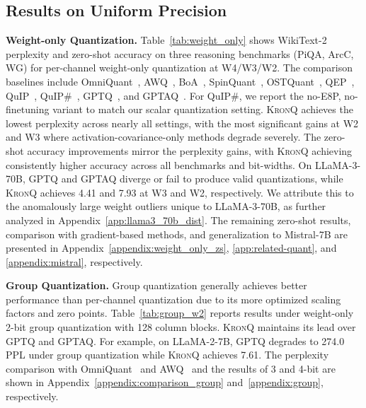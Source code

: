 \documentclass{article} %
\newcommand{\KronQ}{\textsc{KronQ}}
\begin{document}
\subsection{Results on Uniform Precision}
\label{sec:exp:wonly}
\vspace{-2mm}
\noindent \textbf{Weight-only Quantization.} Table~\ref{tab:weight_only} shows WikiText-2 perplexity and zero-shot accuracy on three reasoning benchmarks (PiQA, ArcC, WG) for per-channel weight-only quantization at W4/W3/W2. The comparison baselines include OmniQuant~\citep{shao2023omniquant}, AWQ~\citep{lin2024awq}, BoA~\citep{kim2024boa}, SpinQuant~\citep{liu2024spinquant}, OSTQuant~\citep{hu2025ostquant}, QEP~\citep{arai2025quantization}, QuIP~\citep{chee2023quip}, QuIP\#~\citep{tseng2024quip},  GPTQ~\citep{frantar2022gptq}, and GPTAQ~\citep{li2025gptaq}. For QuIP\#, we report the no-E8P, no-finetuning variant to match our scalar quantization setting. \KronQ{} achieves the lowest perplexity across nearly all settings, with the most significant gains at W2 and W3 where activation-covariance-only methods degrade severely. The zero-shot accuracy improvements mirror the perplexity gains, with \KronQ{} achieving consistently higher accuracy across all benchmarks and bit-widths. On LLaMA-3-70B, GPTQ and GPTAQ diverge or fail to produce valid quantizations, while \KronQ{} achieves 4.41 and 7.93 at W3 and W2, respectively. We attribute this to the anomalously large weight outliers unique to LLaMA-3-70B, as further analyzed in Appendix~\ref{app:llama3_70b_dist}. The remaining zero-shot results, comparison with gradient-based methods, and generalization to Mistral-7B are presented in Appendix~\ref{appendix:weight_only_zs}, \ref{app:related-quant}, and \ref{appendix:mistral}, respectively.


\noindent \textbf{Group Quantization.} 
Group quantization generally achieves better performance than per-channel quantization due to its more optimized scaling factors and zero points. Table~\ref{tab:group_w2} reports results under weight-only 2-bit group quantization with 128 column blocks. \KronQ{} maintains its lead over GPTQ and GPTAQ. For example, on LLaMA-2-7B, GPTQ degrades to 274.0 PPL under group quantization while \KronQ{} achieves 7.61. The perplexity comparison with OmniQuant~\citep{shao2023omniquant} and AWQ~\citep{lin2024awq} and the results of 3 and 4-bit are shown in Appendix~\ref{appendix:comparison_group} and~\ref{appendix:group}, respectively.
\end{document}
